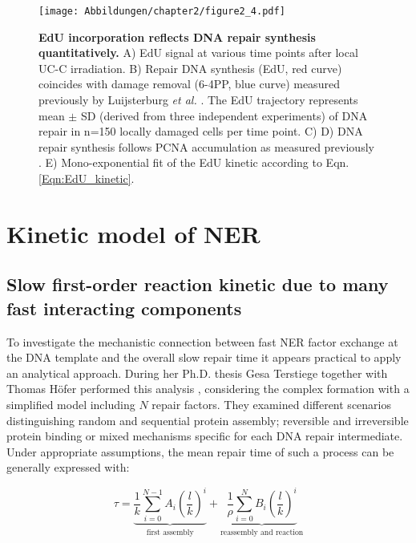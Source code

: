 \begin{figure}[b!]
\begin{center}
\texttt{[image: Abbildungen/chapter2/figure2\_4.pdf]}
\caption{\textbf{EdU incorporation reflects DNA repair synthesis quantitatively.} A) EdU signal at various time points after local UC-C irradiation. B) Repair DNA synthesis (EdU, red curve) coincides with damage removal (6-4PP, blue curve) measured previously by Luijsterburg \textit{et al.} \cite{Luijsterburg2010}. The EdU trajectory represents mean $\pm$ SD (derived from three independent experiments) of DNA repair in n=150 locally damaged cells per time point. C) D) DNA repair synthesis follows PCNA accumulation as measured previously \cite{Luijsterburg2010}. E) Mono-exponential fit of the EdU kinetic according to Eqn. \ref{Eqn:EdU_kinetic}.}
\label{fig:DNArepairKinetic}
\end{center}
\end{figure}

\section{Kinetic model of NER}
\subsection{Slow first-order reaction kinetic due to many fast interacting components}
To investigate the mechanistic connection between fast NER factor exchange at the DNA template and the overall slow repair time it appears practical to apply an analytical approach. During her Ph.D. thesis Gesa Terstiege together with Thomas H\"ofer performed this analysis \cite{Terstiege2010,Verbruggen2014}, considering the complex formation with a simplified model including $N$ repair factors. They examined different scenarios distinguishing random and sequential protein assembly; reversible and irreversible protein binding or mixed mechanisms specific for each DNA repair intermediate. Under appropriate assumptions, the mean repair time of such a process can be generally expressed with:

\begin{equation}
\tau = \underbrace{\frac{1}{k}\sum^{N-1}_{i=0}A_i\left(\frac{l}{k}\right)^i}_{\text{first assembly}} +  \underbrace{\frac{1}{\rho}\sum_{i=0}^{N}B_i \left(\frac{l}{k}\right)^i}_{\text{reassembly and reaction}} \label{Eqn:taugen}
\end{equation}

